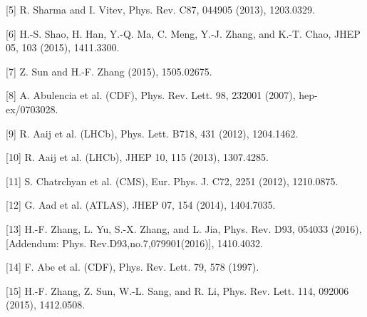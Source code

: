 \documentclass[aps,prc,preprint]{revtex4}
\begin{document}
[5] R. Sharma and I. Vitev, Phys. Rev. C87, 044905 (2013), 1203.0329.

[6] H.-S. Shao, H. Han, Y.-Q. Ma, C. Meng, Y.-J. Zhang, and K.-T. Chao, JHEP 05, 103 (2015),
1411.3300.

[7] Z. Sun and H.-F. Zhang (2015), 1505.02675.

[8] A. Abulencia et al. (CDF), Phys. Rev. Lett. 98, 232001 (2007), hep-ex/0703028.

[9] R. Aaij et al. (LHCb), Phys. Lett. B718, 431 (2012), 1204.1462.

[10] R. Aaij et al. (LHCb), JHEP 10, 115 (2013), 1307.4285.

[11] S. Chatrchyan et al. (CMS), Eur. Phys. J. C72, 2251 (2012), 1210.0875.

[12] G. Aad et al. (ATLAS), JHEP 07, 154 (2014), 1404.7035.

[13] H.-F. Zhang, L. Yu, S.-X. Zhang, and L. Jia, Phys. Rev. D93, 054033 (2016), 
 [Addendum: Phys. Rev.D93,no.7,079901(2016)], 1410.4032.

[14] F. Abe et al. (CDF), Phys. Rev. Lett. 79, 578 (1997).

[15] H.-F. Zhang, Z. Sun, W.-L. Sang, and R. Li, Phys. Rev. Lett. 114, 092006 (2015), 1412.0508.
\end{document}
